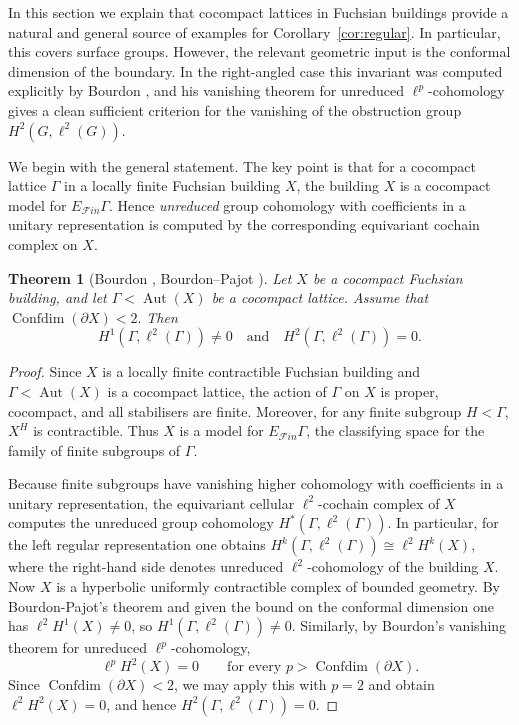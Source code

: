 \documentclass[12pt]{amsproc}
\theoremstyle{plain}
\newtheorem{theorem}{Theorem}[section]
\theoremstyle{definition}
\numberwithin{equation}{section}
\DeclareMathOperator{\Aut}{Aut}
\DeclareMathOperator{\Confdim}{Confdim}
\begin{document}
\medskip

In this section we explain that cocompact lattices in Fuchsian buildings
provide a natural and general source of examples for
Corollary~\ref{cor:regular}. In particular, this covers surface groups. However, the relevant geometric input is the conformal dimension of
the boundary. In the right-angled case this invariant was computed
explicitly by Bourdon \cite{Bou97}, and his vanishing theorem for
unreduced $\ell^p$-cohomology gives a clean sufficient criterion for the
vanishing of the obstruction group $H^2(G,\ell^2(G))$.

We begin with the general statement. The key point is that for a cocompact
lattice $\Gamma$ in a locally finite Fuchsian building $X$, the building $X$
is a cocompact model for $E_{\mathcal F\!in}\Gamma$. Hence \emph{unreduced} group
cohomology with coefficients in a unitary representation is computed by the
corresponding equivariant cochain complex on $X$. 

\begin{theorem}[Bourdon \cite{Bou16}, Bourdon--Pajot \cite{BP03}]\label{thm:fuchsian-building-application}
Let $X$ be a cocompact Fuchsian building, and let
$\Gamma<\Aut(X)$ be a cocompact lattice. Assume that
$
\Confdim(\partial X)<2.
$
Then
$$H^1(\Gamma,\ell^2(\Gamma)) \neq 0 \quad\text{and}\quad H^2(\Gamma,\ell^2(\Gamma))=0.$$

\end{theorem}

\begin{proof}
Since $X$ is a locally finite contractible Fuchsian building and
$\Gamma<\Aut(X)$ is a cocompact lattice, the action of $\Gamma$ on $X$ is
proper, cocompact, and all stabilisers are finite. Moreover, for any finite subgroup $H<\Gamma$, $X^H$ is contractible. Thus $X$ is a model for
$E_{\mathcal F\!in}\Gamma$, the classifying space for the family of finite
subgroups of $\Gamma$.

Because finite subgroups have vanishing higher cohomology with coefficients
in a unitary representation, the equivariant cellular $\ell^2$-cochain complex of $X$
computes the unreduced group cohomology $H^*(\Gamma,\ell^2(\Gamma))$. In particular,
for the left regular representation one obtains
$
H^k(\Gamma,\ell^2(\Gamma))\cong \ell^2 H^k(X),
$
where the right-hand side denotes unreduced $\ell^2$-cohomology of the
building $X$.
Now $X$ is a hyperbolic uniformly contractible complex of bounded geometry.
By Bourdon-Pajot's theorem \cite{BP03} and given the bound on the conformal dimension one has $\ell^2 H^1(X)\ne 0$, so $H^1(\Gamma,\ell^2(\Gamma))\ne 0$. Similarly, by Bourdon's vanishing theorem \cite{Bou16} for unreduced $\ell^p$-cohomology,
\[
\ell^p H^2(X)=0
\qquad\text{for every }p>\Confdim(\partial X).
\]
Since $\Confdim(\partial X)<2$, we may apply this with $p=2$ and obtain
$
\ell^2 H^2(X)=0
$, and hence
$
H^2(\Gamma,\ell^2(\Gamma))=0.
$
\end{proof}
\end{document}
